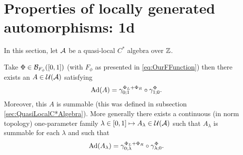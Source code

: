 \documentclass[11pt,a4paper,twoside]{article}
\numberwithin{equation}{section}
\begin{document}
	\section{Properties of locally generated automorphisms: 1d}\label{sec:properties-of-locally-generated-automorphisms-1d}
	In this section, let $\AA$ be a quasi-local $C^*$ algebra over $\ZZ$.
	\begin{lemma}\label{lem:PropertiesLocallyGeneratedAutomorphisms1d}
		Take $\Phi\in\BB_{F_\phi}([0,1])$ (with $F_\phi$ as presented in \eqref{eq:OurFFunction}) then there exists an $A\in\UU(\AA)$ satisfying
		\begin{equation}
			\Ad{A}=\gamma^{\Phi_L+\Phi_R}_{0;1}\circ\gamma^\Phi_{1;0}.
		\end{equation}
		Moreover, this $A$ is summable (this was defined in subsection \ref{sec:QuasiLocalC*Algebra}). More generally there exists a continuous (in norm topology) one-parameter family $\lambda\in[0,1]\mapsto A_\lambda\in\UU(\AA)$ such that $A_\lambda$ is summable for each $\lambda$ and such that
		\begin{equation}
			\Ad{A_\lambda}=\gamma^{\Phi_L+\Phi_R}_{0;\lambda}\circ\gamma^\Phi_{\lambda;0}.
		\end{equation}
	\end{lemma}
\end{document}
